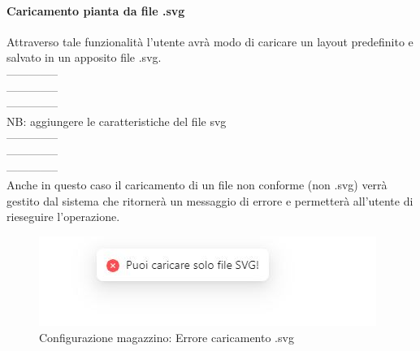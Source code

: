             \paragraph{Caricamento pianta da file .svg} \label{sec:creazione:configurazione:svg}
            Attraverso tale funzionalità l'utente avrà modo di caricare un layout predefinito e salvato in un apposito file .svg.\\
            --------------\\
            --------------\\
            --------------\\
            NB: aggiungere le caratteristiche del file svg\\
            --------------\\
            --------------\\
            --------------\\
            Anche in questo caso il caricamento di un file non conforme (non .svg) verrà gestito dal sistema che ritornerà un messaggio di errore e permetterà 
            all'utente di rieseguire l'operazione. 
            \begin{figure}[h!]
                \centering
                \includegraphics[]{images/errore_caricamento_svg.png}
                \caption{Configurazione magazzino: Errore caricamento .svg}
            \end{figure}
           

        
